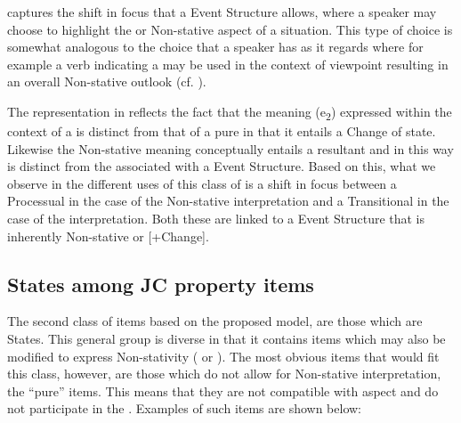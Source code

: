  captures the shift in focus that a  Event Structure allows, where a speaker may choose to highlight the  or Non-stative aspect of a situation. This type of choice is somewhat analogous to the choice that a speaker has as it regards  where for example a verb indicating a  may be used in the context of  viewpoint resulting in an overall Non-stative outlook (cf. \citealt{Smith1983}). 

The representation in  reflects the fact that the  meaning (e\textsubscript{2}) expressed within the context of a  is distinct from that of a pure  in that it entails a Change of state. Likewise the Non-stative meaning conceptually entails a resultant  and in this way is distinct from the  associated with a  Event Structure. Based on this, what we observe in the different uses of this class of  is a shift in focus between a Processual  in the case of the Non-stative interpretation and a Transitional  in the case of the  interpretation. Both these are linked to a  Event Structure that is inherently Non-stative or [+Change]. 


\subsection{States among JC property items}\label{sec:5.2.2}
The second class of items based on the proposed model, are those which are States. This general group is diverse in that it contains items which may also be modified to express Non-stativity ( or ). The most obvious items that would fit this class, however, are those which do not allow for Non-stative interpretation, the ``pure''  items. This means that they are not compatible with  aspect and do not participate in the . Examples of such items are shown below: 

\ea%
\label{ex:5:14}

 

